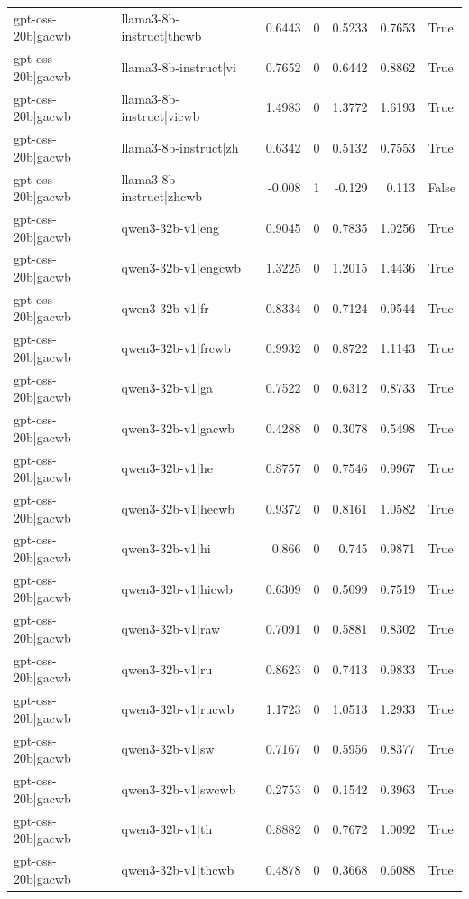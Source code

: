 \begin{table}
\begin{tabular}{l l r r r r l}
gpt-oss-20b|gacwb & llama3-8b-instruct|thcwb & 0.6443 & 0 & 0.5233 & 0.7653 & True \\
gpt-oss-20b|gacwb & llama3-8b-instruct|vi & 0.7652 & 0 & 0.6442 & 0.8862 & True \\
gpt-oss-20b|gacwb & llama3-8b-instruct|vicwb & 1.4983 & 0 & 1.3772 & 1.6193 & True \\
gpt-oss-20b|gacwb & llama3-8b-instruct|zh & 0.6342 & 0 & 0.5132 & 0.7553 & True \\
gpt-oss-20b|gacwb & llama3-8b-instruct|zhcwb & -0.008 & 1 & -0.129 & 0.113 & False \\
gpt-oss-20b|gacwb & qwen3-32b-v1|eng & 0.9045 & 0 & 0.7835 & 1.0256 & True \\
gpt-oss-20b|gacwb & qwen3-32b-v1|engcwb & 1.3225 & 0 & 1.2015 & 1.4436 & True \\
gpt-oss-20b|gacwb & qwen3-32b-v1|fr & 0.8334 & 0 & 0.7124 & 0.9544 & True \\
gpt-oss-20b|gacwb & qwen3-32b-v1|frcwb & 0.9932 & 0 & 0.8722 & 1.1143 & True \\
gpt-oss-20b|gacwb & qwen3-32b-v1|ga & 0.7522 & 0 & 0.6312 & 0.8733 & True \\
gpt-oss-20b|gacwb & qwen3-32b-v1|gacwb & 0.4288 & 0 & 0.3078 & 0.5498 & True \\
gpt-oss-20b|gacwb & qwen3-32b-v1|he & 0.8757 & 0 & 0.7546 & 0.9967 & True \\
gpt-oss-20b|gacwb & qwen3-32b-v1|hecwb & 0.9372 & 0 & 0.8161 & 1.0582 & True \\
gpt-oss-20b|gacwb & qwen3-32b-v1|hi & 0.866 & 0 & 0.745 & 0.9871 & True \\
gpt-oss-20b|gacwb & qwen3-32b-v1|hicwb & 0.6309 & 0 & 0.5099 & 0.7519 & True \\
gpt-oss-20b|gacwb & qwen3-32b-v1|raw & 0.7091 & 0 & 0.5881 & 0.8302 & True \\
gpt-oss-20b|gacwb & qwen3-32b-v1|ru & 0.8623 & 0 & 0.7413 & 0.9833 & True \\
gpt-oss-20b|gacwb & qwen3-32b-v1|rucwb & 1.1723 & 0 & 1.0513 & 1.2933 & True \\
gpt-oss-20b|gacwb & qwen3-32b-v1|sw & 0.7167 & 0 & 0.5956 & 0.8377 & True \\
gpt-oss-20b|gacwb & qwen3-32b-v1|swcwb & 0.2753 & 0 & 0.1542 & 0.3963 & True \\
gpt-oss-20b|gacwb & qwen3-32b-v1|th & 0.8882 & 0 & 0.7672 & 1.0092 & True \\
gpt-oss-20b|gacwb & qwen3-32b-v1|thcwb & 0.4878 & 0 & 0.3668 & 0.6088 & True \\

\end{tabular}
\end{table}
